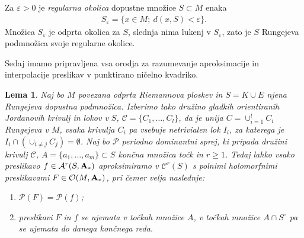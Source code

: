\documentclass[12pt,a4paper,twoside]{article}
\theoremstyle{definition} %
\theoremstyle{plain} %
\newtheorem{lema}[definicija]{Lema}
\numberwithin{equation}{section}  %
\begin{document}
Za $\varepsilon > 0$ je \emph{regularna okolica} dopustne množice $S \subset M$ enaka
\begin{gather}
S_{\varepsilon} = \{ x \in M; \ d(x,S) < \varepsilon \}.
\end{gather}
Množica $S_{\varepsilon}$ je odprta okolica za $S$, slednja nima lukenj v $S_{\varepsilon}$, zato je $S$ Rungejeva podmnožica svoje regularne okolice.

Sedaj imamo pripravljena vsa orodja za razumevanje aproksimacije in interpolacije preslikav v punktirano ničelno kvadriko.

\begin{lema} \label{lema:aproks&interp-A*}
Naj bo $M$ povezana odprta Riemannova ploskev in $S = K \cup E$ njena Rungejeva dopustna podmnožica.
Izberimo tako družino gladkih orientiranih Jordanovih krivulj in lokov v $S$, $\mathcal{C} = \{ C_{1}, \dots , C_{l} \}$, da je unija $C = \cup_{i=1}^{l} C_{i}$ Rungejeva v $M$, vsaka krivulja $C_{i}$ pa vsebuje netrivialen lok $I_{i}$, za katerega je $I_{i} \cap (\cup_{i \neq j} C_{j}) = \emptyset$.
Naj bo $\mathcal{P}$ periodno dominantni sprej, ki pripada družini krivulj $\mathcal{C}$, $A = \{ a_{1}, \dots , a_{m} \} \subset S$ končna množica točk in $r \geq 1$.
Tedaj lahko vsako preslikavo $f \in \mathcal{A}^{r}(S, \textbf{\textup{A}}_{*})$ aproksimiramo v $\mathcal{C}^{r}(S)$ s polnimi holomorfnimi preslikavami $F \in \mathcal{O}(M,\textbf{\textup{A}}_{*})$, pri čemer velja naslednje:
\begin{enumerate}
\item $\mathcal{P}(F) = \mathcal{P}(f)$;
\item preslikavi $F$ in $f$ se ujemata v točkah množice $A$, v točkah množice $A \cap S^{\circ}$ pa se ujemata do danega končnega reda.
\end{enumerate}
\end{lema}
\end{document}
